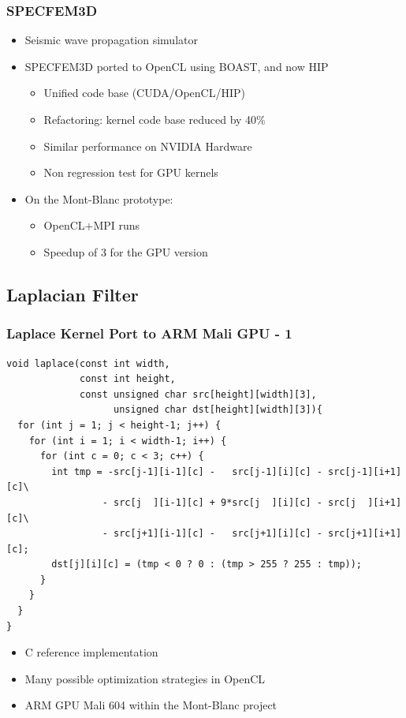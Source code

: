 \documentclass{beamer}
\begin{document}
\begin{frame}
  \frametitle{SPECFEM3D}

  \begin{itemize}
   \item Seismic wave propagation simulator
    \item SPECFEM3D ported to OpenCL using BOAST, and now HIP
    \begin{itemize}
      \item Unified code base (CUDA/OpenCL/HIP)
      \item Refactoring: kernel code base reduced by 40\%
      \item Similar performance on NVIDIA Hardware
      \item Non regression test for GPU kernels
    \end{itemize}
    \item On the Mont-Blanc prototype:
    \begin{itemize}
      \item OpenCL+MPI runs
      \item Speedup of 3 for the GPU version
    \end{itemize}
  \end{itemize}
\end{frame}

\subsection{Laplacian Filter}

\begin{frame}[fragile]
  \frametitle{Laplace Kernel Port to ARM Mali GPU - 1}
\lstset{style=BC}
\begin{lstlisting}
void laplace(const int width,
             const int height,
             const unsigned char src[height][width][3],
                   unsigned char dst[height][width][3]){
  for (int j = 1; j < height-1; j++) {
    for (int i = 1; i < width-1; i++) {
      for (int c = 0; c < 3; c++) {
        int tmp = -src[j-1][i-1][c] -   src[j-1][i][c] - src[j-1][i+1][c]\
                 - src[j  ][i-1][c] + 9*src[j  ][i][c] - src[j  ][i+1][c]\
                 - src[j+1][i-1][c] -   src[j+1][i][c] - src[j+1][i+1][c];
        dst[j][i][c] = (tmp < 0 ? 0 : (tmp > 255 ? 255 : tmp));
      }
    }
  }
}
\end{lstlisting}
\begin{itemize}
\item C reference implementation
\item Many possible optimization strategies in OpenCL
\item ARM GPU Mali 604 within the Mont-Blanc project
\end{itemize}
\end{frame}
\end{document}
